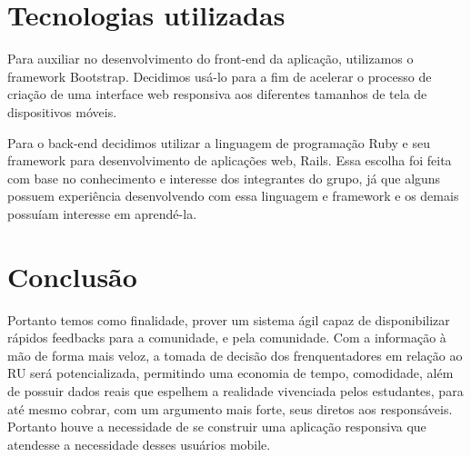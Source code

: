 \documentclass[12pt]{article}
\begin{document}
\section{Tecnologias utilizadas}


Para auxiliar no desenvolvimento do front-end da aplicação, utilizamos o framework Bootstrap.
Decidimos usá-lo para a fim de acelerar o processo de criação de uma interface web responsiva aos
diferentes tamanhos de tela de dispositivos móveis.

Para o back-end decidimos utilizar a linguagem de programação Ruby e seu framework para
desenvolvimento de aplicações web, Rails. Essa escolha foi feita com base no conhecimento e interesse
dos integrantes do grupo, já que alguns possuem experiência desenvolvendo com essa linguagem e framework e os demais possuíam interesse em aprendé-la.


\section{Conclusão}

Portanto temos como finalidade, prover um sistema ágil capaz de disponibilizar
rápidos feedbacks para a comunidade, e pela comunidade. Com a informação à mão de forma mais veloz,
a tomada de decisão dos frenquentadores em relação ao RU será potencializada, permitindo uma
economia de tempo, comodidade, além de possuir dados reais que espelhem a realidade vivenciada
pelos estudantes, para até mesmo cobrar, com um argumento mais forte, seus diretos aos responsáveis.
Portanto houve a necessidade de se construir uma aplicação responsiva que atendesse a necessidade
desses usuários mobile.

%
%
%
%
%
\end{document}
